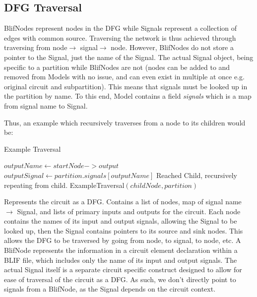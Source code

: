 \documentclass[12pt,final,oneside]{dwThesis} %
\begin{document}
   \subsection{\gls{DFG}
      Traversal} BlifNodes represent nodes in the \gls{DFG}
   while Signals represent a collection of edges with common source. Traversing
   the network is thus achieved through traversing from node$\rightarrow$
   signal$\rightarrow$ node. However, \mbox{BlifNodes} do not store a pointer to the
   Signal, just the name of the Signal. The actual Signal object, being
   specific to a partition while BlifNodes are not (nodes can be added to and
   removed from Models with no issue, and can even exist in multiple at once
   e.g. original circuit and subpartition). This means that signals must be
   looked up in the partition by name. To this end, Model contains a field \textit{signals}
    which is a map from signal name to Signal.

   Thus, an example which recursively traverses from a node to its children
   would be: 
   \begin{algorithm}
      \caption{Example Traversal}\label{algExTrav}

      \begin{algorithmic}[1]
         \State $outputName \gets startNode->output$
         \State $outputSignal \gets
         partition.signals[outputName]$  
         \State Reached Child, recursively
         repeating from child.  
         \State ExampleTraversal$(childNode, partition)$
          \EndFor \EndProcedure

      \end{algorithmic}

   \end{algorithm}


   Represents the circuit as a DFG. Contains a list of nodes, map of signal
   name $\to$ Signal, and lists of primary inputs and outputs for the circuit.
   Each node contains the names of its input and output signals, allowing the
   Signal to be looked up, then the Signal contains pointers to its source and
   sink nodes.  This allows the DFG to be traversed by going from node, to
   signal, to node, etc.  A BlifNode represents the information in a circuit
   element declaration within a \gls{BLIF} file, which includes only the name
   of its input and output signals. The actual Signal itself is a separate
   circuit specific construct designed to allow for ease of traversal of the
   circuit as a \gls{DFG}.  As such, we don't directly point to signals from a
   BlifNode, as the Signal depends on the circuit context.  
\end{document}

